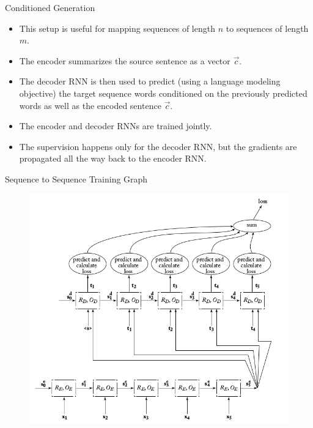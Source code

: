 \documentclass[handout]{beamer}
\begin{document}
\begin{frame}{Conditioned Generation}
\begin{scriptsize}
\begin{itemize}
\item This setup is useful for mapping sequences of length $n$ to sequences of length $m$.
\item The encoder summarizes the source sentence as a vector $\vec{c}$.
\item The decoder RNN is then used to predict (using a language modeling objective) the target sequence words conditioned on the previously predicted words as well as the encoded sentence $\vec{c}$.
\item The encoder and decoder RNNs are trained jointly.
\item The supervision happens only for the decoder RNN, but the gradients are propagated all the way back to the encoder RNN.
\end{itemize}
\end{scriptsize}
\end{frame}


\begin{frame}{Sequence to Sequence Training Graph}
         \begin{figure}[h]
        	\includegraphics[scale = 0.35]{pics/seq2se2train.png}
        \end{figure}  
    
\end{frame}
\end{document}

